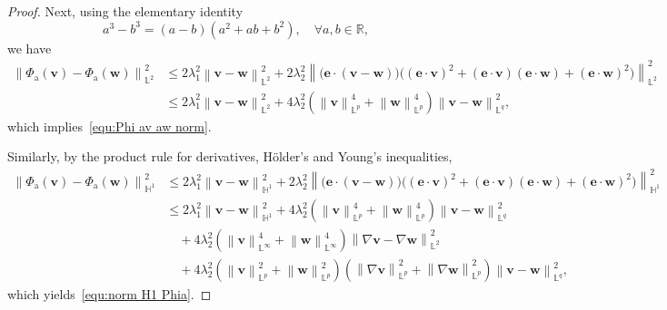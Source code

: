 \documentclass[11pt, reqno]{amsart}
\theoremstyle{definition}
\numberwithin{equation}{section}
\newcommand{\bff}{\boldsymbol}
\newcommand{\bb}{\mathbb}
\newcommand{\norm}[2]{\left\|{#1}\right\|_{#2}}
\begin{document}
\begin{proof}
Next, using the elementary identity
\begin{equation}\label{equ:a3b3}
a^3-b^3=(a-b)(a^2+ab+b^2), \quad \forall a,b\in\bb{R},
\end{equation}
we have
\begin{align*}
     \norm{\Phi_{\mathrm{a}}(\bff{v})-\Phi_{\mathrm{a}}(\bff{w})}{\bb{L}^2}^2
    &\leq
    2\lambda_1^2 \norm{\bff{v}-\bff{w}}{\bb{L}^2}^2
    +
    2\lambda_2^2 \norm{\big(\bff{e}\cdot (\bff{v}-\bff{w})\big) \big((\bff{e}\cdot \bff{v})^2 + (\bff{e}\cdot \bff{v})(\bff{e}\cdot \bff{w})+ (\bff{e}\cdot \bff{w})^2\big)}{\bb{L}^2}^2
    \\
    &\leq
    2\lambda_1^2 \norm{\bff{v}-\bff{w}}{\bb{L}^2}^2
    +
    4\lambda_2^2 \left(\norm{\bff{v}}{\bb{L}^p}^4+ \norm{\bff{w}}{\bb{L}^p}^4\right) \norm{\bff{v}-\bff{w}}{\bb{L}^q}^2,
\end{align*}
which implies~\eqref{equ:Phi av aw norm}.

Similarly, by the product rule for derivatives, H\"older's and Young's inequalities,
\begin{align*}
     \norm{\Phi_{\mathrm{a}}(\bff{v})-\Phi_{\mathrm{a}}(\bff{w})}{\bb{H}^1}^2
    &\leq
    2\lambda_1^2 \norm{\bff{v}-\bff{w}}{\bb{H}^1}^2
    +
    2\lambda_2^2 \norm{\big(\bff{e}\cdot (\bff{v}-\bff{w})\big) \big((\bff{e}\cdot \bff{v})^2 + (\bff{e}\cdot \bff{v})(\bff{e}\cdot \bff{w})+ (\bff{e}\cdot \bff{w})^2\big)}{\bb{H}^1}^2
    \\
    &\leq
    2\lambda_1^2 \norm{\bff{v}-\bff{w}}{\bb{H}^1}^2
    +
    4\lambda_2^2 \left(\norm{\bff{v}}{\bb{L}^p}^4+ \norm{\bff{w}}{\bb{L}^p}^4\right) \norm{\bff{v}-\bff{w}}{\bb{L}^q}^2
    \\
    &\quad
    + 4\lambda_2^2 \left(\norm{\bff{v}}{\bb{L}^\infty}^4+ \norm{\bff{w}}{\bb{L}^\infty}^4\right) \norm{\nabla \bff{v}-\nabla \bff{w}}{\bb{L}^2}^2
    \\
    &\quad
    +
    4\lambda_2^2 \left(\norm{\bff{v}}{\bb{L}^p}^2 + \norm{\bff{w}}{\bb{L}^p}^2\right) \left(\norm{\nabla \bff{v}}{\bb{L}^p}^2 + \norm{\nabla \bff{w}}{\bb{L}^p}^2 \right) \norm{\bff{v}-\bff{w}}{\bb{L}^q}^2,
\end{align*}
which yields~\eqref{equ:norm H1 Phia}.


\end{proof}
\end{document}
